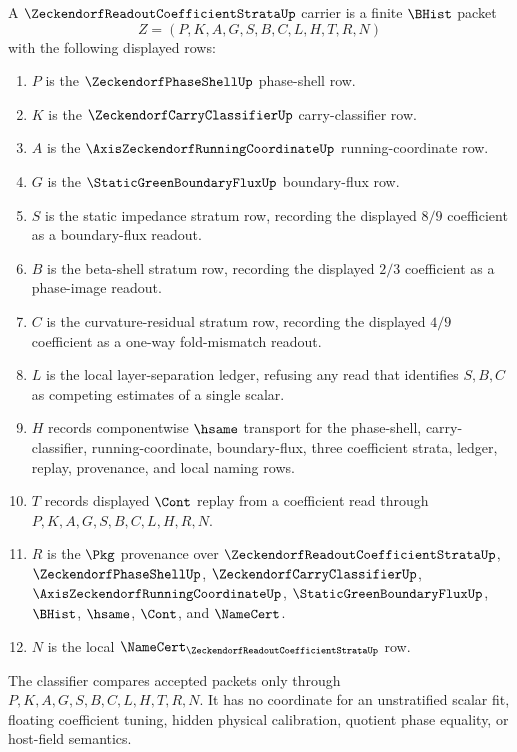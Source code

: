 \begin{definition}
\label{def:zeckendorf-readout-coefficient-strata-carrier}
A $\ZeckendorfReadoutCoefficientStrataUp$ carrier is a finite $\BHist$ packet
$$
Z=(P,K,A,G,S,B,C,L,H,T,R,N)
$$
with the following displayed rows:
\begin{enumerate}
\item $P$ is the $\ZeckendorfPhaseShellUp$ phase-shell row.
\item $K$ is the $\ZeckendorfCarryClassifierUp$ carry-classifier row.
\item $A$ is the $\AxisZeckendorfRunningCoordinateUp$ running-coordinate row.
\item $G$ is the $\StaticGreenBoundaryFluxUp$ boundary-flux row.
\item $S$ is the static impedance stratum row, recording the displayed $8/9$ coefficient as a boundary-flux readout.
\item $B$ is the beta-shell stratum row, recording the displayed $2/3$ coefficient as a phase-image readout.
\item $C$ is the curvature-residual stratum row, recording the displayed $4/9$ coefficient as a one-way fold-mismatch readout.
\item $L$ is the local layer-separation ledger, refusing any read that identifies $S,B,C$ as competing estimates of a single scalar.
\item $H$ records componentwise $\hsame$ transport for the phase-shell, carry-classifier, running-coordinate, boundary-flux, three coefficient strata, ledger, replay, provenance, and local naming rows.
\item $T$ records displayed $\Cont$ replay from a coefficient read through $P,K,A,G,S,B,C,L,H,R,N$.
\item $R$ is the $\Pkg$ provenance over $\ZeckendorfReadoutCoefficientStrataUp$, $\ZeckendorfPhaseShellUp$, $\ZeckendorfCarryClassifierUp$, $\AxisZeckendorfRunningCoordinateUp$, $\StaticGreenBoundaryFluxUp$, $\BHist$, $\hsame$, $\Cont$, and $\NameCert$.
\item $N$ is the local $\NameCert_{\ZeckendorfReadoutCoefficientStrataUp}$ row.
\end{enumerate}
The classifier compares accepted packets only through $P,K,A,G,S,B,C,L,H,T,R,N$. It has no coordinate for an unstratified scalar fit, floating coefficient tuning, hidden physical calibration, quotient phase equality, or host-field semantics.
\end{definition}

